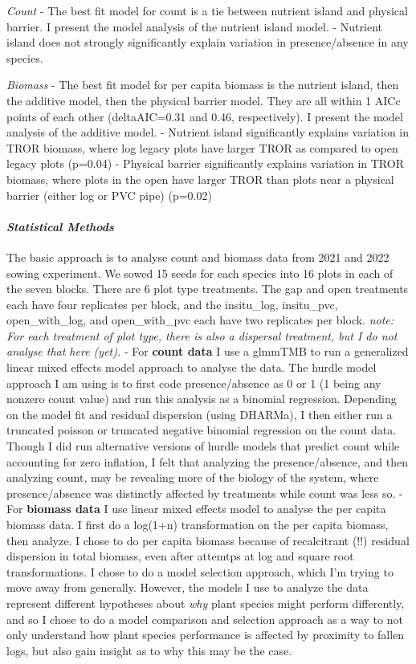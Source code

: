 \documentclass[
]{article}
\begin{document}
\emph{Count} - The best fit model for count is a tie between nutrient
island and physical barrier. I present the model analysis of the
nutrient island model. - Nutrient island does not strongly significantly
explain variation in presence/absence in any species.

\emph{Biomass} - The best fit model for per capita biomass is the
nutrient island, then the additive model, then the physical barrier
model. They are all within 1 AICc points of each other (deltaAIC=0.31
and 0.46, respectively). I present the model analysis of the additive
model. - Nutrient island significantly explains variation in TROR
biomass, where log legacy plots have larger TROR as compared to open
legacy plots (p=0.04) - Physical barrier significantly explains
variation in TROR biomass, where plots in the open have larger TROR than
plots near a physical barrier (either log or PVC pipe) (p=0.02)

\hypertarget{statistical-methods-2}{%
\paragraph{\texorpdfstring{\emph{Statistical Methods}
}{Statistical Methods  }}\label{statistical-methods-2}}

The basic approach is to analyse count and biomass data from 2021 and
2022 sowing experiment. We sowed 15 seeds for each species into 16 plots
in each of the seven blocks. There are 6 plot type treatments. The gap
and open treatments each have four replicates per block, and the
insitu\_log, insitu\_pvc, open\_with\_log, and open\_with\_pvc each have
two replicates per block. \emph{note: For each treatment of plot type,
there is also a dispersal treatment, but I do not analyse that here
(yet).} - For \textbf{count data} I use a glmmTMB to run a generalized
linear mixed effects model approach to analyse the data. The hurdle
model approach I am using is to first code presence/absence as 0 or 1 (1
being any nonzero count value) and run this analysis as a binomial
regression. Depending on the model fit and residual dispersion (using
DHARMa), I then either run a truncated poisson or truncated negative
binomial regression on the count data. Though I did run alternative
versions of hurdle models that predict count while accounting for zero
inflation, I felt that analyzing the presence/absence, and then
analyzing count, may be revealing more of the biology of the system,
where presence/absence was distinctly affected by treatments while count
was less so. - For \textbf{biomass data} I use linear mixed effects
model to analyse the per capita biomass data. I first do a log(1+n)
transformation on the per capita biomass, then analyze. I chose to do
per capita biomass because of recalcitrant (!!) residual dispersion in
total biomass, even after attemtps at log and square root
transformations. I chose to do a model selection approach, which I'm
trying to move away from generally. However, the models I use to analyze
the data represent different hypotheses about \emph{why} plant species
might perform differently, and so I chose to do a model comparison and
selection approach as a way to not only understand how plant species
performance is affected by proximity to fallen logs, but also gain
insight as to why this may be the case.
\end{document}
